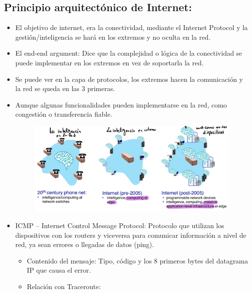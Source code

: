 \documentclass[12pt, twoside, openright]{report} %
\begin{document}
\subsection{Principio arquitectónico de Internet:}

\begin{itemize}
	\item El objetivo de internet, era la conectividad, mediante el Internet
	      Protocol y la gestión/inteligencia se hará en los extremos y no
	      oculta en la red.
	\item El end-end argument: Dice que la complejidad o lógica de la
	      conectividad se puede implementar en los extremos en vez de
	      soportarla la red.
	\item Se puede ver en la capa de protocolos, los extremos hacen la
	      comunicación y la red se queda en las 3 primeras.
	\item Aunque algunas funcionalidades pueden implementarse en la red, como
	      congestión o transferencia fiable.

	      \begin{figure}[H]
		      {\includegraphics[scale=.35]{Untitled 38.png}}
	      \end{figure}
	\item ICMP -- Internet Control Message Protocol: Protocolo que utilizan
	      los dispositivos con los routers y viceversa para comunicar
	      información a nivel de red, ya sean errores o llegadas de datos
	      (ping).

	      \begin{itemize}
		      \item Contenido del mensaje: Tipo, código y los 8 primeros bytes del
		            datagrama IP que causa el error.
		      \item Relación con Traceroute:


\end{itemize}
\end{itemize}
\end{document}
